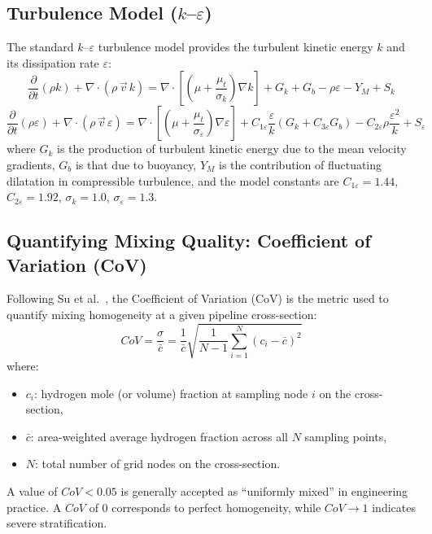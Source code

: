 \documentclass[12pt, a4paper]{report}
\begin{document}
\subsection{Turbulence Model ($k$--$\varepsilon$)}
The standard $k$--$\varepsilon$ turbulence model \cite{Su2022} provides the turbulent kinetic energy $k$ and its dissipation rate $\varepsilon$:
\begin{equation}
    \frac{\partial}{\partial t}(\rho k) + \nabla \cdot (\rho \, \vec{v} \, k) = \nabla \cdot \left[ \left( \mu + \frac{\mu_t}{\sigma_k} \right) \nabla k \right] + G_k + G_b - \rho \varepsilon - Y_M + S_k
\end{equation}
\begin{equation}
    \frac{\partial}{\partial t}(\rho \varepsilon) + \nabla \cdot (\rho \, \vec{v} \, \varepsilon) = \nabla \cdot \left[ \left( \mu + \frac{\mu_t}{\sigma_\varepsilon} \right) \nabla \varepsilon \right] + C_{1\varepsilon} \frac{\varepsilon}{k}(G_k + C_{3\varepsilon} G_b) - C_{2\varepsilon} \rho \frac{\varepsilon^2}{k} + S_\varepsilon
\end{equation}
where $G_k$ is the production of turbulent kinetic energy due to the mean velocity gradients, $G_b$ is that due to buoyancy, $Y_M$ is the contribution of fluctuating dilatation in compressible turbulence, and the model constants are $C_{1\varepsilon} = 1.44$, $C_{2\varepsilon} = 1.92$, $\sigma_k = 1.0$, $\sigma_\varepsilon = 1.3$.

\subsection{Quantifying Mixing Quality: Coefficient of Variation (CoV)}
Following Su et al.\ \cite{Su2022}, the Coefficient of Variation (CoV) is the metric used to quantify mixing homogeneity at a given pipeline cross-section:
\begin{equation}
    CoV = \frac{\sigma}{\bar{c}} = \frac{1}{\bar{c}} \sqrt{\frac{1}{N-1} \sum_{i=1}^{N} (c_i - \bar{c})^2}
    \label{eq:cov}
\end{equation}
where:
\begin{itemize}
    \item $c_i$: hydrogen mole (or volume) fraction at sampling node $i$ on the cross-section,
    \item $\bar{c}$: area-weighted average hydrogen fraction across all $N$ sampling points,
    \item $N$: total number of grid nodes on the cross-section.
\end{itemize}
A value of $CoV < 0.05$ is generally accepted as ``uniformly mixed'' in engineering practice. A $CoV$ of $0$ corresponds to perfect homogeneity, while $CoV \to 1$ indicates severe stratification.
\end{document}
